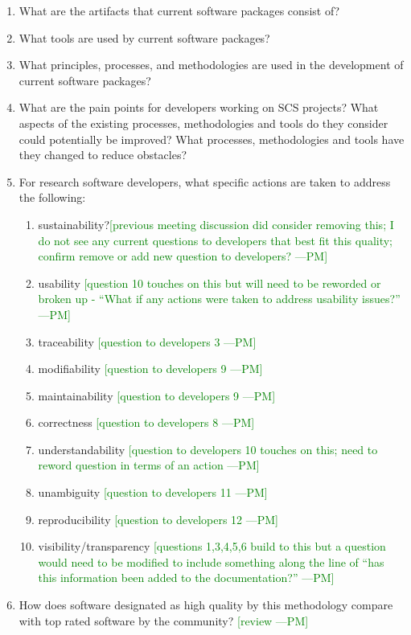 \documentclass[letterpaper,cleveref]{lipics-v2019}
\newcommand{\authornote}[3]{\textcolor{#1}{[#3 ---#2]}}
\newcommand{\authornote}[3]{}
\newcommand{\pmi}[1]{\authornote{green}{PM}{#1}} %
\theoremstyle{definition}
\begin{document}
\begin{enumerate}
\item What are the artifacts that current software packages consist of? 
\item What tools are used by current software packages?
\item What principles, processes, and methodologies are used in the development of current software packages?
\item What are the pain points for developers working on SCS projects? What aspects of the existing processes, methodologies and tools do they consider could potentially be improved? What processes, methodologies and tools have they changed to reduce obstacles?
\item For research software developers, what specific actions are taken to address the following:
\begin{enumerate}
\item sustainability?\pmi{previous meeting discussion did consider removing this; I do not see any current questions to developers that best fit this quality; confirm remove or add new question to developers?}
\item usability \pmi{question 10 touches on this but will need to be reworded or broken up - ``What if any actions were taken to address usability issues?''}
\item traceability \pmi{question to developers 3}
\item modifiability \pmi{question to developers 9}
\item maintainability \pmi{question to developers 9}
\item correctness \pmi{question to developers 8}
\item understandability \pmi{question to developers 10 touches on this; need to reword question in terms of an action}
\item unambiguity \pmi{question to developers 11}
\item reproducibility \pmi{question to developers 12}
\item visibility/transparency \pmi{questions 1,3,4,5,6 build to this but a question would need to be modified to include something along the line of ``has this information been added to the documentation?''}
\end{enumerate} 
\item How does software designated as high quality by this methodology compare with top rated software by the community? \pmi{review}
\end{enumerate}
\end{document}
